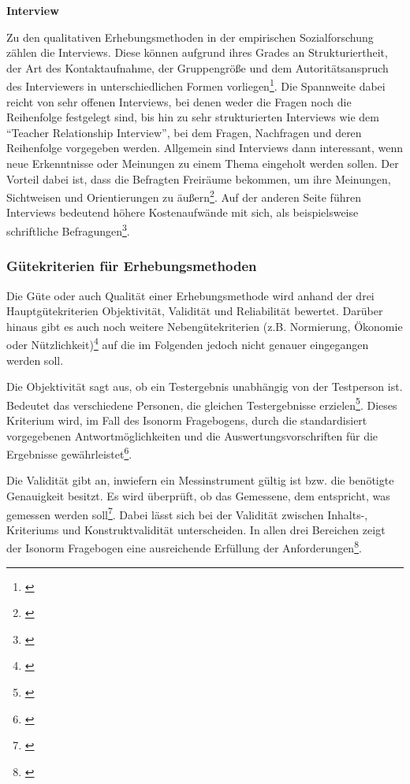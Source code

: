 \textbf{Interview}

Zu den qualitativen Erhebungsmethoden in der empirischen Sozialforschung zählen die Interviews. Diese können aufgrund ihres Grades an Strukturiertheit, der Art des Kontaktaufnahme, der Gruppengröße und dem Autoritätsanspruch des Interviewers in unterschiedlichen Formen vorliegen\footnote{\cite[vgl.][61]{Hegner2003}}. Die Spannweite dabei reicht von sehr offenen Interviews, bei denen weder die Fragen noch die Reihenfolge festgelegt sind, bis hin zu sehr strukturierten Interviews wie dem \enquote{Teacher Relationship Interview}, bei dem Fragen, Nachfragen und deren Reihenfolge vorgegeben werden. Allgemein sind Interviews dann interessant, wenn neue Erkenntnisse oder Meinungen zu einem Thema eingeholt werden sollen. Der Vorteil dabei ist, dass die Befragten Freiräume bekommen, um ihre Meinungen, Sichtweisen und Orientierungen zu äußern\footnote{\cite[vgl.][52\psqq]{Kelle2008}}. Auf der anderen Seite führen Interviews bedeutend höhere Kostenaufwände mit sich, als beispielsweise schriftliche Befragungen\footnote{\cite[vgl.][62\psq]{Hegner2003}}.


\subsubsection{Gütekriterien für Erhebungsmethoden}

Die Güte oder auch Qualität einer Erhebungsmethode wird anhand der drei Hauptgütekriterien Objektivität, Validität und Reliabilität bewertet. Darüber hinaus gibt es auch noch weitere Nebengütekriterien (z.B. Normierung, Ökonomie oder Nützlichkeit)\footnote{\cite[vgl.][Kap. 3.5]{Figl2010}} auf die im Folgenden jedoch nicht genauer eingegangen werden soll.

Die Objektivität sagt aus, ob ein Testergebnis unabhängig von der Testperson ist. Bedeutet das verschiedene Personen, die gleichen Testergebnisse erzielen\footnote{\cite[vgl.][Kap. 1]{Himme2007}}. Dieses Kriterium wird, im Fall des Isonorm Fragebogens, durch die standardisiert vorgegebenen Antwortmöglichkeiten und die Auswertungsvorschriften für die Ergebnisse gewährleistet\footnote{\cite[vgl.][Kap. 3.5.1]{Figl2010}}.

Die Validität gibt an, inwiefern ein Messinstrument gültig ist bzw. die benötigte Genauigkeit besitzt. Es wird überprüft, ob das Gemessene, dem entspricht, was gemessen werden soll\footnote{\cite[vgl][Kap. 1]{Himme2007}}. Dabei lässt sich bei der Validität zwischen Inhalts-, Kriteriums und Konstruktvalidität unterscheiden. In allen drei Bereichen zeigt der Isonorm Fragebogen eine ausreichende Erfüllung der Anforderungen\footnote{\cite[vgl.][Kap. 3.5.2]{Figl2010}}.

